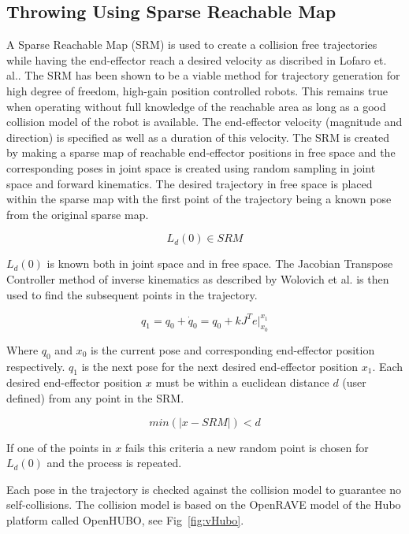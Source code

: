 \subsection{Throwing Using Sparse Reachable Map}\label{sec:sec:srm}

A Sparse Reachable Map (SRM) is used to create a collision free trajectories while having the end-effector reach a desired velocity as discribed in Lofaro et. al.\cite{dlofaro-srm}.
The SRM has been shown to be a viable method for trajectory generation for high degree of freedom, high-gain position controlled robots.  This remains true when operating without full knowledge of the reachable area as long as a good collision model of the robot is available. 
The end-effector velocity (magnitude and direction) is specified as well as a duration of this velocity. 
The SRM is created by making a sparse map of reachable end-effector positions in free space and the corresponding poses in joint space is created using random sampling in joint space and forward kinematics. 
The desired trajectory in free space is placed within the sparse map with the first point of the trajectory being a known pose from the original sparse map. 

\begin{equation}
L_d(0) \in SRM
\end{equation}

$L_d(0)$ is known both in joint space and in free space.
The Jacobian Transpose Controller method of inverse kinematics as described by Wolovich et al.\cite{4048118} is then used to find the subsequent points in the trajectory. 

\begin{equation}
q_1 = q_0 + \dot{q}_0 = q_0 + kJ^Te|_{x_0}^{x_1}
\end{equation}

Where $q_0$ and $x_0$ is the current pose and corresponding end-effector position respectively.  $q_1$ is the next pose for the next desired end-effector position $x_1$.
Each desired end-effector position $x$ must be within a euclidean distance $d$ (user defined) from any point in the SRM.

\begin{equation}
min \left(|x - SRM| \right) < d
\end{equation}

If one of the points in $x$ fails this criteria a new random point is chosen for $L_d(0)$ and the process is repeated.

Each pose in the trajectory is checked against the collision model to guarantee no self-collisions.  The collision model is based on the OpenRAVE model of the Hubo platform called OpenHUBO, see Fig~\ref{fig:vHubo}.

